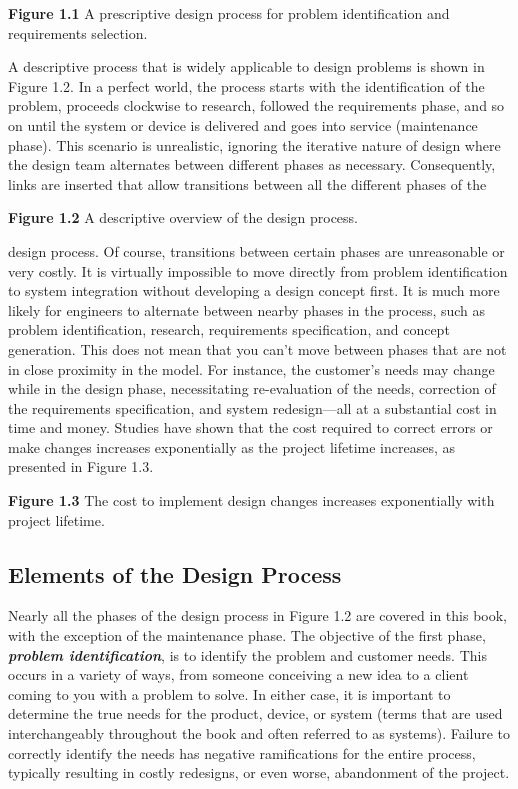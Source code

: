 \documentclass[a4paper,10pt]{book}
\begin{document}

\textbf{Figure 1.1} A prescriptive design process for problem
identification and requirements selection.

A descriptive process that is widely applicable to design problems is
shown in Figure 1.2. In a perfect world, the process starts with the
identification of the problem, proceeds clockwise to research, followed
the requirements phase, and so on until the system or device is
delivered and goes into service (maintenance phase). This scenario is
unrealistic, ignoring the iterative nature of design where the design
team alternates between different phases as necessary. Consequently,
links are inserted that allow transitions between all the different
phases of the


\textbf{Figure 1.2} A descriptive overview of the design process.

design process. Of course, transitions between certain phases are
unreasonable or very costly. It is virtually impossible to move directly
from problem identification to system integration without developing a
design concept first. It is much more likely for engineers to alternate
between nearby phases in the process, such as problem identification,
research, requirements specification, and concept generation. This does
not mean that you can't move between phases that are not in close
proximity in the model. For instance, the customer's needs may change
while in the design phase, necessitating re-evaluation of the needs,
correction of the requirements specification, and system redesign---all
at a substantial cost in time and money. Studies have shown that the
cost required to correct errors or make changes increases exponentially
as the project lifetime increases, as presented in Figure 1.3.


\textbf{Figure 1.3} The cost to implement design changes increases
exponentially with project lifetime.

\subsection{Elements of the Design Process}

Nearly all the phases of the design process in Figure 1.2 are covered in
this book, with the exception of the maintenance phase. The objective of
the first phase, \emph{\textbf{problem identification}}, is to identify
the problem and customer needs. This occurs in a variety of ways, from
someone conceiving a new idea to a client coming to you with a problem
to solve. In either case, it is important to determine the true needs
for the product, device, or system (terms that are used interchangeably
throughout the book and often referred to as systems). Failure to
correctly identify the needs has negative ramifications for the entire
process, typically resulting in costly redesigns, or even worse,
abandonment of the project.
\end{document}

